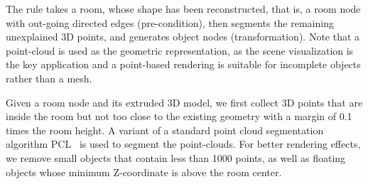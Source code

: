 The rule takes a room, whose shape has been reconstructed, that is, a
room node with out-going directed edges (pre-condition), then segments
the remaining unexplained 3D points, and generates object nodes
(transformation). Note that a point-cloud is used as the geometric
representation, as the scene visualization is the key application and a
point-based rendering is suitable for incomplete objects rather than a
mesh.

Given a room node and its extruded 3D model, we first collect 3D points
that are inside the room but not too close to the existing
geometry with a margin of 0.1 times the room height.
A variant of a standard point cloud segmentation algorithm
PCL~\cite{PCL} is used to segment the point-clouds. For better rendering
effects, we remove small objects that contain less than 1000 points, as
well as floating objects whose minimum Z-coordinate is above the room
center.






